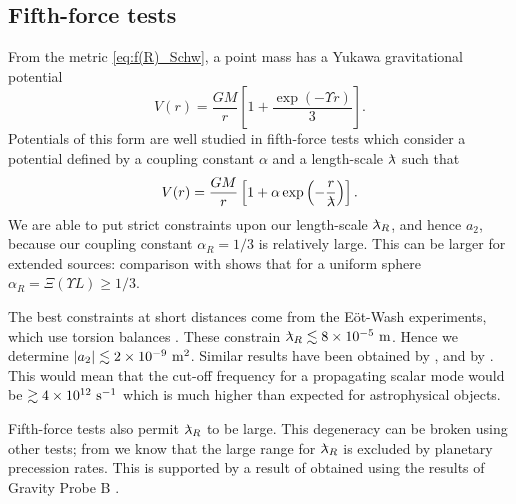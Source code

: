 \subsection{Fifth-force tests\label{sec:Fifth}}

From the metric \eqref{eq:f(R)_Schw}, a point mass has a Yukawa gravitational potential \citep{Stelle1978, Capozziello2009a, Naf2010}
\begin{equation}
V(r) = \frac{GM}{r}\left[1 + \frac{\exp(- \Upsilon r)}{3}\right].
\end{equation}
Potentials of this form are well studied in fifth-force tests \citep{Will2006, Adelberger2009, Adelberger2003} which consider a potential defined by a coupling constant $\alpha$ and a length-scale $\lambdabar$ such that
\begin{equation}
V(r) = \frac{GM}{r}\left[1 + \alpha\exp\left(-\frac{r}{\lambdabar}\right)\right].
\end{equation}
We are able to put strict constraints upon our length-scale $\lambdabar_R$, and hence $a_2$, because our coupling constant $\alpha_R = 1/3$ is relatively large. This can be larger for extended sources: comparison with  shows that for a uniform sphere $\alpha_R = \Xi(\Upsilon L) \geq 1/3$.

The best constraints at short distances come from the E\"{o}t-Wash experiments, which use torsion balances \citep{Kapner2007a, Hoyle2004}. These constrain $\lambdabar_R \lesssim 8\times 10^{-5}\units{m}$. Hence we determine $|a_2| \lesssim 2 \times 10^{-9}~\mathrm{m^2}$. Similar results have been obtained by \citet{Cembranos2009}, and by \citet{Naf2010}. This would mean that the cut-off frequency for a propagating scalar mode would be $\gtrsim 4 \times 10^{12}~\mathrm{s^{-1}}$ which is much higher than expected for astrophysical objects.

Fifth-force tests also permit $\lambdabar_R$ to be large. This degeneracy can be broken using other tests; from  we know that the large range for $\lambdabar_R$ is excluded by planetary precession rates. This is supported by a result of \citet{Naf2010} obtained using the results of Gravity Probe B \citep{Everitt2009,Everitt2011}.

